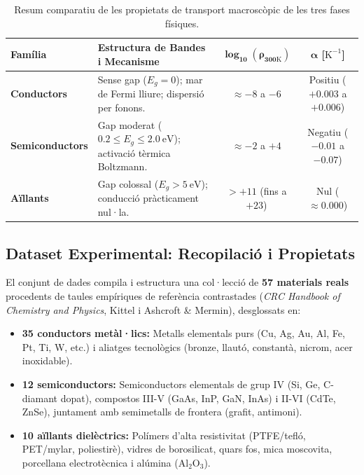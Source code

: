 \documentclass[a4paper,11pt]{article}
\begin{document}
\begin{table}[H]
\centering
\small
\begin{tabularx}{\textwidth}{@{}l>{\raggedright\arraybackslash}Xcc@{}}
\toprule
\textbf{Família} & \textbf{Estructura de Bandes i Mecanisme} & $\mathbf{\log_{10}(\rho_{300\mathrm{K}})}$ & $\mathbf{\alpha}$ [$\text{K}^{-1}$] \\
\midrule
\textbf{Conductors} & Sense gap ($E_g = 0$); mar de Fermi lliure; dispersió per fonons. & $\approx -8$ a $-6$ & Positiu ($+0.003$ a $+0.006$) \\
\textbf{Semiconductors} & Gap moderat ($0.2 \le E_g \le 2.0\ \text{eV}$); activació tèrmica Boltzmann. & $\approx -2$ a $+4$ & Negatiu ($-0.01$ a $-0.07$) \\
\textbf{Aïllants} & Gap colossal ($E_g > 5\ \text{eV}$); conducció pràcticament nul·la. & $> +11$ (fins a $+23$) & Nul ($\approx 0.000$) \\
\bottomrule
\end{tabularx}
\caption{Resum comparatiu de les propietats de transport macroscòpic de les tres fases físiques.}
\label{tab:comparativa_familias}
\end{table}

\subsection{Dataset Experimental: Recopilació i Propietats}

El conjunt de dades compila i estructura una col·lecció de \textbf{57 materials reals} procedents de taules empíriques de referència contrastades (\textit{CRC Handbook of Chemistry and Physics}, Kittel i Ashcroft \& Mermin), desglossats en:
\begin{itemize}
    \item \textbf{35 conductors metàl·lics:} Metalls elementals purs (Cu, Ag, Au, Al, Fe, Pt, Ti, W, etc.) i aliatges tecnològics (bronze, llautó, constantà, nicrom, acer inoxidable).
    \item \textbf{12 semiconductors:} Semiconductors elementals de grup IV (Si, Ge, C-diamant dopat), compostos III-V (GaAs, InP, GaN, InAs) i II-VI (CdTe, ZnSe), juntament amb semimetalls de frontera (grafit, antimoni).
    \item \textbf{10 aïllants dielèctrics:} Polímers d'alta resistivitat (PTFE/tefló, PET/mylar, poliestirè), vidres de borosilicat, quars fos, mica moscovita, porcellana electrotècnica i alúmina ($\text{Al}_2\text{O}_3$).
\end{itemize}
\end{document}

